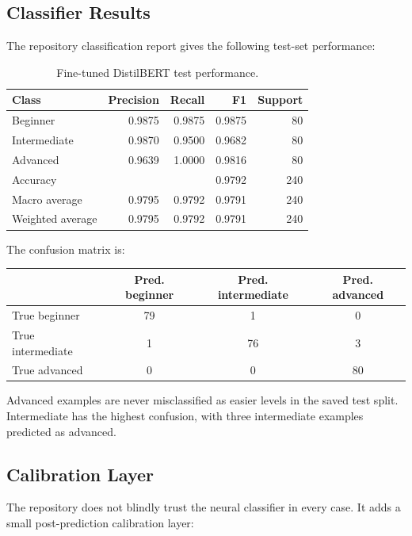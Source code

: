 \documentclass[11pt,a4paper]{article}
\begin{document}
\subsection{Classifier Results}

The repository classification report gives the following test-set performance:

\begin{table}[H]
\centering
\begin{tabular}{lrrrr}
\toprule
\textbf{Class} & \textbf{Precision} & \textbf{Recall} & \textbf{F1} & \textbf{Support} \\
\midrule
Beginner & 0.9875 & 0.9875 & 0.9875 & 80 \\
Intermediate & 0.9870 & 0.9500 & 0.9682 & 80 \\
Advanced & 0.9639 & 1.0000 & 0.9816 & 80 \\
\midrule
Accuracy & \multicolumn{3}{r}{0.9792} & 240 \\
Macro average & 0.9795 & 0.9792 & 0.9791 & 240 \\
Weighted average & 0.9795 & 0.9792 & 0.9791 & 240 \\
\bottomrule
\end{tabular}
\caption{Fine-tuned DistilBERT test performance.}
\label{tab:classifier-results}
\end{table}

The confusion matrix is:

\begin{center}
\begin{tabular}{lccc}
\toprule
& \textbf{Pred. beginner} & \textbf{Pred. intermediate} & \textbf{Pred. advanced} \\
\midrule
True beginner & 79 & 1 & 0 \\
True intermediate & 1 & 76 & 3 \\
True advanced & 0 & 0 & 80 \\
\bottomrule
\end{tabular}
\end{center}

Advanced examples are never misclassified as easier levels in the saved test split. Intermediate has the highest confusion, with three intermediate examples predicted as advanced.

\subsection{Calibration Layer}

The repository does not blindly trust the neural classifier in every case. It adds a small post-prediction calibration layer:
\end{document}
